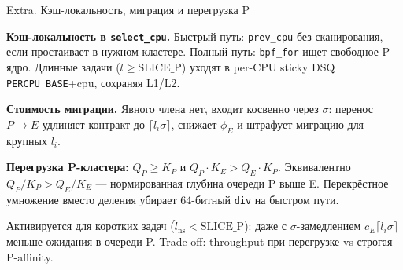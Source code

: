 \documentclass[aspectratio=169,11pt]{beamer}
\begin{document}
\begin{frame}{Extra. Кэш-локальность, миграция и перегрузка P}
        \scriptsize
        \begin{shadowbox2}
                \textbf{Кэш-локальность в \texttt{select\_cpu}.}
                Быстрый путь: \texttt{prev\_cpu} без сканирования, если
                простаивает в нужном кластере. Полный путь:
                \texttt{bpf\_for} ищет свободное P-ядро. Длинные
                задачи ($l \geq \text{SLICE\_P}$) уходят в per-CPU
                sticky DSQ \texttt{PERCPU\_BASE}+cpu, сохраняя L1/L2.
        \end{shadowbox2}

        \vspace{0.2em}
        \begin{shadowbox2}
                \textbf{Стоимость миграции.}
                Явного члена нет, входит косвенно через $\sigma$:
                перенос $P\to E$ удлиняет контракт до $\lceil
                l_i\sigma\rceil$, снижает $\phi_E$ и штрафует
                миграцию для крупных $l_i$.
        \end{shadowbox2}

        \vspace{0.2em}
        \begin{shadowbox}
                \textbf{Перегрузка P-кластера:}
                $Q_P \geq K_P$ и $Q_P \cdot K_E > Q_E \cdot K_P$.
                Эквивалентно $Q_P/K_P > Q_E/K_E$ — нормированная
                глубина очереди P выше E. Перекрёстное умножение
                вместо деления убирает 64-битный \texttt{div} на
                быстром пути.

                \vspace{0.15em}
                Активируется для коротких задач ($\hat l_{\text{ns}}
                < \text{SLICE\_P}$): даже с $\sigma$-замедлением
                $c_E\lceil l_i\sigma\rceil$ меньше ожидания в очереди
                P. Trade-off: throughput при перегрузке vs строгая
                P-affinity.
        \end{shadowbox}
\end{frame}
\addtocounter{framenumber}{-1}
\end{document}
